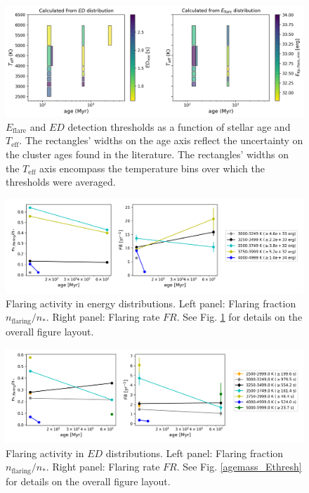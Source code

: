 \documentclass{aa}
\begin{document}
     \begin{figure}
            \includegraphics[width=\hsize]{pics/age_mass_AM/cutoff_MK_cutoff_MK_s_erg_2019_03_22_15.png}
         \caption{$E_\mathrm{flare}$ and $ED$ detection thresholds as a function of stellar age and $T_\mathrm{eff}$. The rectangles' widths on the age axis reflect the uncertainty on the cluster ages found in the literature. The rectangles' widths on the $T_\mathrm{eff}$ axis encompass the temperature bins over which the thresholds were averaged.}
         \label{agemass_thresh}
   \end{figure}

    \begin{figure}
            \includegraphics[width=\hsize]{pics/Teffbin_age_mass_AM/FR_flarefrac_energy_2019_03_22_15.png}
       \caption{Flaring activity in energy distributions. Left panel: Flaring fraction $n_\mathrm{flaring}/n_*$. Right panel: Flaring rate $FR$. See Fig. \ref{agemass_thresh} for details on the overall figure layout.}
       \label{agemass_FR_flarefrac_erg}
   \end{figure}
   \begin{figure}
            \includegraphics[width=\hsize]{pics/Teffbin_age_mass_AM/FR_flarefrac_ED_2019_03_22_15.png}
         \caption{Flaring activity in $ED$ distributions. Left panel: Flaring fraction $n_\mathrm{flaring}/n_*$. Right panel: Flaring rate $FR$. See Fig. \ref{agemass_Ethresh} for details on the overall figure layout.}
          \label{agemass_FR_flarefrac_s}
   \end{figure}
\end{document}
